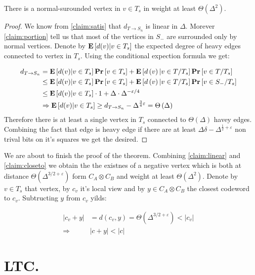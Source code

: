 \begin{claim}
  \label{claim:linear}
  There is a normal-surounded vertex in $v \in T_{s}$ in weight at least $\Theta\left(\Delta^{2}\right)$.   
 \end{claim}
 \begin{proof}
   We know from \cref{claim:satis} that $d_{T\rightarrow S_{n} }$ is linear in $\Delta$. Morever \cref{claim:portion} tell us that most of the vertices in $S_{-}$ are surrounded only by normal vertices. Denote by $\mathbf{E} \left[ { d(v) | v \in T_{s} } \right]$ the expected degree of heavy edges connected to vertex in $T_{s}$. Using the conditional expection formula we get:
  
   \begin{equation*}
     \begin{split}
       d_{T \rightarrow S_{n}} &= \mathbf{E} \left[ { d(v) | v \in T_{s} } \right] \mathbf{Pr} \left[  v \in T_{s} \right] + \mathbf{E} \left[ {d\left( v \right) | v \in T / T_{s}} \right] \mathbf{Pr} \left[  v \in T / T_{s} \right] \\
       & \le \mathbf{E} \left[ { d(v) | v \in T_{s} } \right] \mathbf{Pr} \left[  v \in T_{s} \right] + \mathbf{E} \left[ {d\left( v \right) | v \in T / T_{s}} \right] \mathbf{Pr} \left[  v \in S_{-} / T_{s} \right] \\
       & \le \mathbf{E} \left[ { d(v) | v \in T_{s} } \right] \cdot 1   + \Delta \cdot  \Delta^{-\varepsilon/4} \\
       & \Rightarrow  \mathbf{E} \left[ { d(v) | v \in T_{s} } \right] \ge d_{T \rightarrow S_{n}} - \Delta^{\frac{3}{4} \varepsilon} = \Theta\left( \Delta \right) 
     \end{split}
   \end{equation*}
   Therefore there is at least a single vertex in $T_{s}$ connected to $\Theta\left( \Delta \right)$ havey edges. Combining the fact that edge is heavy edge if there are at least $\Delta\delta - \Delta^{\frac{1}{2} + \varepsilon}$ non trival bits on it's squares we get the desired.  
 \end{proof}

 We are about to finish the proof of the theorem. Combining \cref{claim:linear} and \cref{claim:closeto} we obtain the the existnes of a negative vertex which is both at distance $\Theta\left(\Delta^{3/2 + \varepsilon}\right)$ form $C_{A}\otimes C_{B}$ and weight at least $\Theta\left( \Delta^{2} \right)$. Denote by $v \in T_{s}$ that vertex, by $c_{v}$ it's local view and by $y \in C_{A}\otimes C_{B}$ the closest codeword to $c_{v}$. Subtructing $y$ from $c_{v}$ yilds: 
 
 \begin{equation*}
   \begin{split}
     \left|   c_{v} + y   \right| &= d\left( c_{v}, y  \right) = \Theta\left( \Delta^{3/2 + \varepsilon} \right) < \left|   c_{v}   \right|     \\
     \Rightarrow & | c + y| < |c| 
   \end{split}
 \end{equation*}

 \section{LTC.}




